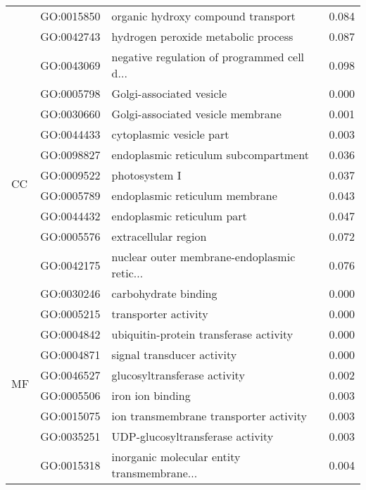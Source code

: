 \begin{longtable}{lllr}
   & GO:0015850 &           organic hydroxy compound transport &         0.084 \\
   & GO:0042743 &          hydrogen peroxide metabolic process &         0.087 \\
   & GO:0043069 &  negative regulation of programmed cell d... &         0.098 \\
\cline{1-4}
\multirow{9}{*}{CC} & GO:0005798 &                     Golgi-associated vesicle &         0.000 \\
   & GO:0030660 &            Golgi-associated vesicle membrane &         0.001 \\
   & GO:0044433 &                     cytoplasmic vesicle part &         0.003 \\
   & GO:0098827 &         endoplasmic reticulum subcompartment &         0.036 \\
   & GO:0009522 &                                photosystem I &         0.037 \\
   & GO:0005789 &               endoplasmic reticulum membrane &         0.043 \\
   & GO:0044432 &                   endoplasmic reticulum part &         0.047 \\
   & GO:0005576 &                         extracellular region &         0.072 \\
   & GO:0042175 &  nuclear outer membrane-endoplasmic retic... &         0.076 \\
\cline{1-4}
\multirow{57}{*}{MF} & GO:0030246 &                         carbohydrate binding &         0.000 \\
   & GO:0005215 &                         transporter activity &         0.000 \\
   & GO:0004842 &       ubiquitin-protein transferase activity &         0.000 \\
   & GO:0004871 &                   signal transducer activity &         0.000 \\
   & GO:0046527 &                 glucosyltransferase activity &         0.002 \\
   & GO:0005506 &                             iron ion binding &         0.003 \\
   & GO:0015075 &       ion transmembrane transporter activity &         0.003 \\
   & GO:0035251 &             UDP-glucosyltransferase activity &         0.003 \\
   & GO:0015318 &  inorganic molecular entity transmembrane... &         0.004 \\

\end{longtable}

